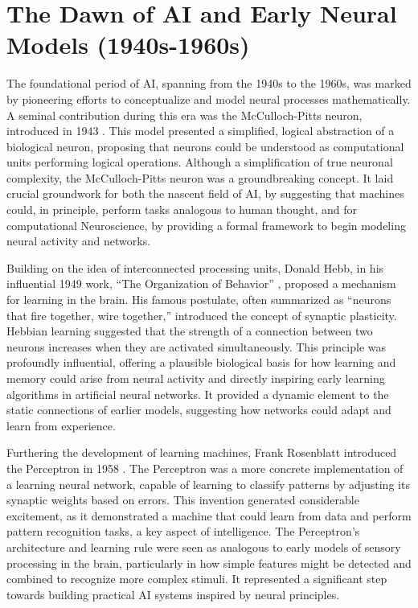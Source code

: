 \section{The Dawn of AI and Early Neural Models (1940s-1960s)}

The foundational period of AI, spanning from the 1940s to the 1960s, was marked by pioneering efforts to conceptualize and model neural processes mathematically. A seminal contribution during this era was the McCulloch-Pitts neuron, introduced in 1943 \cite{mcculloch1943logical}. This model presented a simplified, logical abstraction of a biological neuron, proposing that neurons could be understood as computational units performing logical operations. Although a simplification of true neuronal complexity, the McCulloch-Pitts neuron was a groundbreaking concept. It laid crucial groundwork for both the nascent field of AI, by suggesting that machines could, in principle, perform tasks analogous to human thought, and for computational Neuroscience, by providing a formal framework to begin modeling neural activity and networks.

Building on the idea of interconnected processing units, Donald Hebb, in his influential 1949 work, ``The Organization of Behavior'' \cite{hebb1949organization}, proposed a mechanism for learning in the brain. His famous postulate, often summarized as ``neurons that fire together, wire together,'' introduced the concept of synaptic plasticity. Hebbian learning suggested that the strength of a connection between two neurons increases when they are activated simultaneously. This principle was profoundly influential, offering a plausible biological basis for how learning and memory could arise from neural activity and directly inspiring early learning algorithms in artificial neural networks. It provided a dynamic element to the static connections of earlier models, suggesting how networks could adapt and learn from experience.

Furthering the development of learning machines, Frank Rosenblatt introduced the Perceptron in 1958 \cite{rosenblatt1958perceptron}. The Perceptron was a more concrete implementation of a learning neural network, capable of learning to classify patterns by adjusting its synaptic weights based on errors. This invention generated considerable excitement, as it demonstrated a machine that could learn from data and perform pattern recognition tasks, a key aspect of intelligence. The Perceptron's architecture and learning rule were seen as analogous to early models of sensory processing in the brain, particularly in how simple features might be detected and combined to recognize more complex stimuli. It represented a significant step towards building practical AI systems inspired by neural principles.


